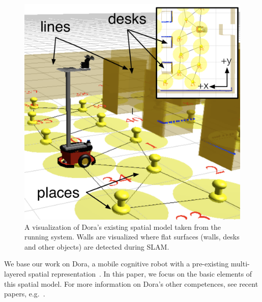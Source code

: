 \documentclass[letterpaper]{article}
\begin{document}
\begin{figure}[t!]
  \includegraphics[width=\columnwidth]{images/classroom-peekabot-annotated.pdf}
  \caption{A visualization of Dora's existing spatial model taken from the running system. Walls are visualized where flat surfaces (walls, desks and other objects) are detected during SLAM.}
  \label{fig:dora-spatial}
\end{figure}

We base our work on Dora, a mobile cognitive robot with a pre-existing multi-layered spatial representation~\cite{Hawes/etal:2011}. In this paper, we focus on the basic elements of this spatial model. For more information on Dora's other competences, see recent papers, e.g.~\cite{Hawes/etal:2011,Hanheide/etal:2011}.
\end{document}
